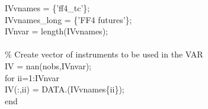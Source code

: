 \hspace{1mm}\hspace{5mm} \hspace{5mm} \hspace{5mm} IVvnames      = \{\textcolor{matlabpurple}{'ff4\_tc'}\}; \\ 
\hspace{1mm}\hspace{5mm} \hspace{5mm} \hspace{5mm} IVvnames\_long = \{\textcolor{matlabpurple}{'FF4 futures'}\}; \\ 
\hspace{1mm}\hspace{5mm} \hspace{5mm} \hspace{5mm} IVnvar        = length(IVvnames); \\ 
\hspace{1mm}\hspace{5mm} \hspace{5mm} \hspace{5mm}  \\ 
\hspace{1mm}\hspace{5mm} \hspace{5mm} \hspace{5mm} \textcolor{matlabgreen}{\% Create vector of instruments to be used in the VAR }\\ 
\hspace{1mm}\hspace{5mm} \hspace{5mm} \hspace{5mm} IV = nan(nobs,IVnvar); \\ 
\hspace{1mm}\hspace{5mm} \hspace{5mm} \hspace{5mm} \textcolor{matlabblue}{for} ii=1:IVnvar \\ 
\hspace{1mm}\hspace{5mm} \hspace{5mm} \hspace{5mm} \hspace{5mm} IV(:,ii) = DATA.(IVvnames\{ii\}); \\ 
\hspace{1mm}\hspace{5mm} \hspace{5mm} \hspace{5mm} \textcolor{matlabblue}{end} \\ 

